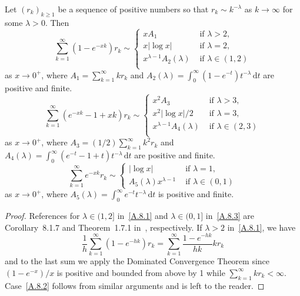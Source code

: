 \documentclass[AHL,Unicode,longabstracts]{cedram}
\newcommand{\gl}{\lambda}
\newcommand{\dd}{\mathrm{d}}
\begin{document}
\pagebreak
\begin{lemm}\label{seriesAsymptotics}
Let $(r_k)_{k\ge1}$ be a sequence of positive numbers so that $r_k\sim k^{-\gl}$ as $k\to\infty$ for some $\gl>0$. Then
\begin{equation} \tag{i} \label{A.8.1}
\sum_{k=1}^\infty (1-e^{-xk})r _k\sim
\begin{cases} x A_1& \text{ if } \gl>2, \\
x |{\log x}| & \text{ if } \gl=2, \\
x^{\gl-1}A_2(\gl) & \text{ if } \gl\in(1, 2) \\
\end{cases}
\end{equation}
as $x\to 0^+$, where $A_1=\sum_{k=1}^\infty k r_k$ and $A_2(\gl)=\int_0^\infty (1-e^{-t}) t^{-\gl}\, \dd t$ are positive and finite.
\begin{equation} \tag{ii} \label{A.8.2}
\sum_{k=1}^\infty (e^{-xk}-1+xk) r_k\sim
\begin{cases} x^2 A_3& \text{ if } \gl>3, \\
x^2|{\log x}|/2 & \text{ if } \gl=3, \\
x^{\gl-1}A_4(\gl) & \text{ if } \gl\in(2, 3) \\
\end{cases}
\end{equation}
as $x\to 0^+$, where $A_3=(1/2)\sum_{k=1}^\infty k^2 r_k$ and $A_4(\gl)=\int_0^\infty (e^{-t}-1+t) t^{-\gl}\, \dd t$ are positive and finite.
\begin{equation} \tag{iii} \label{A.8.3}
\sum_{k=1}^\infty e^{-xk} r_k \sim
\begin{cases}
|{\log x}| & \text{ if } \gl = 1,\\[2pt] A_5(\gl) x^{\gl-1}& \text{ if } \gl \in (0,1)
\end{cases}
\end{equation}
as $x\to 0^+$, where $A_5(\gl)=\int_0^\infty e^{-t}t^{-\gl}\, \dd t$ is positive and finite.
\end{lemm}

\begin{proof}
References for $\gl\in (1,2]$ in~\eqref{A.8.1} and $\gl\in(0,1]$ in~\eqref{A.8.3} are Corollary~8.1.7 and Theorem~1.7.1 in~\cite{BGT89}, respectively. If $\gl>2$ in~\eqref{A.8.1}, we have
\[
\frac{1}{h}\sum_{k=1}^\infty (1-e^{-hk}) r_k=\sum_{k=1}^\infty \frac{1-e^{-hk}}{hk} k r_k
\]
and to the last sum we apply the Dominated Convergence Theorem since $(1-e^{-x})/x$ is positive and bounded from above by 1 while $\sum_{k=1}^\infty k r_k<\infty$. Case~\eqref{A.8.2} follows from similar arguments and is left to the reader.
\end{proof}
\end{document}
